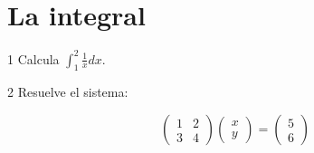 \documentclass[11pt]{article}
\title{#1}\author{#2}\date{}%
\begin{document}

\section*{La integral}

\begin{clkeep}
\begin{clproblem}{1}{}
Calcula \(\int_{1}^{2} \frac{1}{x}dx\).

\end{clproblem}
\end{clkeep}

\begin{clkeep}
\begin{clproblem}{2}{}
Resuelve el sistema:

\[
\begin{pmatrix}1 & 2 \\ 3 & 4\end{pmatrix} \begin{pmatrix}x \\ y\end{pmatrix} = \begin{pmatrix}5 \\ 6\end{pmatrix}
\]
\end{clproblem}
\end{clkeep}
\end{document}
